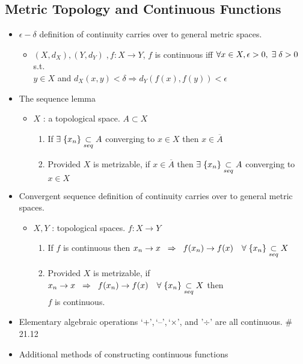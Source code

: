 \documentclass[12pt]{article}
\newcommand{\sptwo}{\hspace{0.2cm}}
\newcommand{\spone}{\hspace{0.1cm}}
\newcommand{\seq}{\underset{seq}{\subset}}
\newcommand{\cl}{\overline}
\newcommand{\exist}{\exists\spone}
\begin{document}
\subsection{Metric Topology and Continuous Functions}
\smallskip
\begin{itemize}
	\item $\epsilon - \delta$ definition of continuity carries over to general metric spaces.
	\begin{itemize}
		\item $(X,d_X), (Y, d_Y)\; ,f: X\rightarrow Y$, \; $f$ is continuous iff $\forall x\in X, \epsilon>0, \; \exist \delta>0$ s.t.\\ $y\in X$ and $ d_X(x,y)<\delta \Rightarrow d_Y(f(x),f(y))<\epsilon$
	\end{itemize}
	\item The sequence lemma
	\begin{itemize}
		\item $X$ : a topological space. $A\subset X$
		\begin{enumerate}
			\item If $\exist \{x_n\}\seq A$ converging to $x\in X$ then $x\in \cl{A}$
			\item Provided $X$ is metrizable, if $x\in \cl{A}$ then $\exist \{x_n\}\seq A$ converging to $x\in X$
		\end{enumerate}
	\end{itemize}
	\item Convergent sequence definition of continuity carries over to general metric spaces.
	\begin{itemize}
		\item $X, Y$ : topological spaces. $f: X\rightarrow Y$ 
		\begin{enumerate}
			\item If $f$ is continuous then $x_n\rightarrow x \sptwo \Rightarrow \sptwo f(x_n)\rightarrow f(x) \quad \forall \spone \{x_n\}\seq X$ 
			\item Provided $X$ is metrizable, if $x_n\rightarrow x \sptwo \Rightarrow \sptwo f(x_n)\rightarrow f(x) \quad \forall \spone \{x_n\}\seq X$ then \\$f$ is continuous.
		\end{enumerate}
	\end{itemize}
	\item Elementary algebraic operations `+',\,`--',\,`$\times$', and '$\div$' are all continuous. \quad \# 21.12
	\item Additional methods of constructing continuous functions
	\begin{itemize}

\end{itemize}
\end{itemize}
\end{document}
